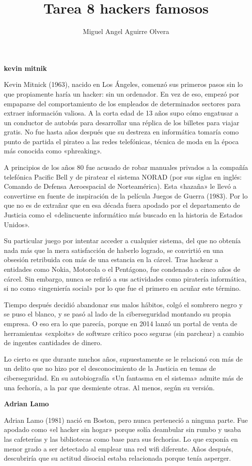\documentclass[11pt,a4paper]{article}
\author{Miguel Angel Aguirre Olvera}
\title{Tarea 8 hackers famosos }
\begin{document}
\maketitle 
\begin{multicols}{2}
\begin{center}
\textbf{kevin mitnik}
\end{center}
Kevin Mitnick (1963), nacido en Los Ángeles, comenzó sus primeros pasos sin lo que propiamente haría un hacker: sin un ordenador. En vez de eso, empezó por empaparse del comportamiento de los empleados de determinados sectores para extraer información valiosa. A la corta edad de 13 años supo cómo engatusar a un conductor de autobús para desarrollar una réplica de los billetes para viajar gratis. No fue hasta años después que su destreza en informática tomaría como punto de partida el pirateo a las redes telefónicas, técnica de moda en la época más conocida como «phreaking».

A principios de los años 80 fue acusado de robar manuales privados a la compañía telefónica Pacific Bell y de piratear el sistema NORAD (por sus siglas en inglés: Comando de Defensa Aeroespacial de Norteamérica). Esta «hazaña» le llevó a convertirse en fuente de inspiración de la película Juegos de Guerra (1983). Por lo que no es de extrañar que en esa década fuera apodado por el departamento de Justicia como el «delincuente informático más buscado en la historia de Estados Unidos».

Su particular juego por intentar acceder a cualquier sistema, del que no obtenía nada más que la mera satisfacción de haberlo logrado, se convirtió en una obsesión retribuida con más de una estancia en la cárcel. Tras hackear a entidades como Nokia, Motorola o el Pentágono, fue condenado a cinco años de cárcel. Sin embargo, nunca se refirió a sus actividades como piratería informática, si no como «ingeniería social» por lo que fue el primero en acuñar este término.

Tiempo después decidió abandonar sus malos hábitos, colgó el sombrero negro y se puso el blanco, y se pasó al lado de la ciberseguridad montando su propia empresa. O eso era lo que parecía, porque en 2014 lanzó un portal de venta de herramientas «exploits» de software crítico poco seguras (sin parchear) a cambio de ingentes cantidades de dinero.

Lo cierto es que durante muchos años, supuestamente se le relacionó con más de un delito que no hizo por el desconocimiento de la Justicia en temas de ciberseguridad. En su autobiografía «Un fantasma en el sistema» admite más de una fechoría, a la par que desmiente otras. Al menos, según su versión.
\begin{center}
\textbf{Adrian Lamo}
\end{center}
Adrian Lamo (1981) nació en Boston, pero nunca perteneció a ninguna parte. Fue apodado como «el hacker sin hogar» porque solía deambular sin rumbo y usaba las cafeterías y las bibliotecas como base para sus fechorías. Lo que exponía en menor grado a ser detectado al emplear una red wifi diferente. Años después, descubriría que su actitud disocial estaba relacionada porque tenía asperger.


\end{multicols}
\end{document}

